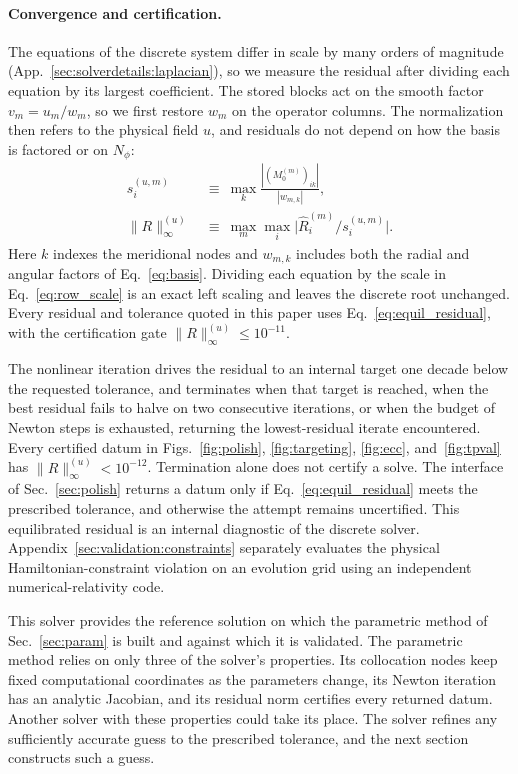 \documentclass[
  aps,
  prd,
  twocolumn,
  10pt,
  amsmath,
  amssymb,
  nofootinbib,
  superscriptaddress,
  floatfix,
]{revtex4-2}
\begin{document}
\paragraph{Convergence and certification.}
The equations of the discrete system differ in scale by many orders of magnitude (App.~\ref{sec:solverdetails:laplacian}), so we measure the residual after dividing each equation by its largest coefficient.
The stored blocks act on the smooth factor $v_m=u_m/w_m$, so we first restore $w_m$ on the operator columns.
The normalization then refers to the physical field $u$, and residuals do not depend on how the basis is factored or on $N_\phi$:
\begin{align}
  s^{(u,m)}_i
  \ &\equiv \
  \max_k \frac{\left|\left(M_0^{(m)}\right)_{ik}\right|}{|w_{m,k}|} ,
  \label{eq:row_scale} \\
  \|R\|^{(u)}_\infty
  \ &\equiv \
  \max_m \max_i
     \bigl| \hat R^{(m)}_{i} \big/ s^{(u,m)}_{i} \bigr| .
  \label{eq:equil_residual}
\end{align}
Here $k$ indexes the meridional nodes and $w_{m,k}$ includes both the radial and angular factors of Eq.~\eqref{eq:basis}.
Dividing each equation by the scale in Eq.~\eqref{eq:row_scale} is an exact left scaling and leaves the discrete root unchanged.
Every residual and tolerance quoted in this paper uses Eq.~\eqref{eq:equil_residual}, with the certification gate $\|R\|^{(u)}_\infty\le10^{-11}$.

The nonlinear iteration drives the residual to an internal target one decade
below the requested tolerance, and terminates when that target is reached, when
the best residual fails to halve on two consecutive iterations, or when the
budget of Newton steps is exhausted, returning the lowest-residual iterate
encountered. Every certified datum in Figs.~\ref{fig:polish}, \ref{fig:targeting}, \ref{fig:ecc}, and~\ref{fig:tpval} has $\|R\|^{(u)}_\infty<10^{-12}$.
Termination alone does not certify a solve.
The interface of Sec.~\ref{sec:polish} returns a datum only if
Eq.~\eqref{eq:equil_residual} meets the prescribed tolerance, and otherwise the
attempt remains uncertified. This equilibrated residual is an internal diagnostic
of the discrete solver. Appendix~\ref{sec:validation:constraints} separately
evaluates the physical Hamiltonian-constraint violation on an evolution grid
using an independent numerical-relativity code.

This solver provides the reference solution on which the parametric method of Sec.~\ref{sec:param} is built and against which it is validated.
The parametric method relies on only three of the solver's properties. Its collocation nodes keep fixed computational coordinates as the parameters change, its Newton iteration has an analytic Jacobian, and its residual norm certifies every returned datum.
Another solver with these properties could take its place.
The solver refines any sufficiently accurate guess to the prescribed tolerance, and the next section constructs such a guess.
\end{document}
